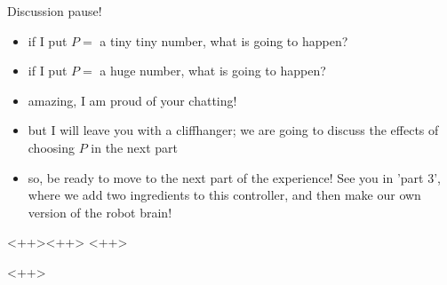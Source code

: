 \begin{frame}{Discussion pause!}
	\begin{itemize}
		\item if I put $P = $ a tiny tiny number, what is going to happen?
		\item if I put $P = $ a huge number, what is going to happen?
	\end{itemize}
\end{frame}


\begin{frame}
	\begin{itemize}
		\item amazing, I am proud of your chatting!
		\item but I will leave you with a cliffhanger; we are going to discuss the effects of choosing $P$ in the next part
		\item so, be ready to move to the next part of the experience! See you in 'part 3', where we add two ingredients to this controller, and then make our own version of the robot brain!
	\end{itemize}
\end{frame}




\begin{frame}{<++>}{<++>}
	<++>
	\note<1-1>{\begin{itemize}
		\item <++>
	\end{itemize}}
\end{frame}
<++>



